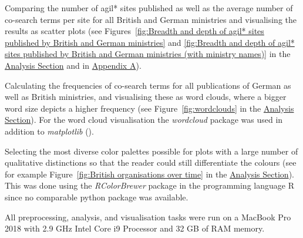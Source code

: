 \begin{compactitem}
\item Comparing the number of agil* sites published as well as the average number of co-search terms per site for all British and German ministries and visualising the results as scatter plots (see Figures~\ref{fig:Breadth and depth of agil* sites published by British and German ministries} and \ref{fig:Breadth and depth of agil* sites published by British and German ministries (with ministry names)} in the \href{Analysis}{Analysis Section} and in \href{Appendix A}{Appendix A}). 
\item Calculating the frequencies of co-search terms for all publications of German as well as British ministries, and visualising these as word clouds, where a bigger word size depicts a higher frequency (see Figure~\ref{fig:wordclouds} in the \href{Analysis}{Analysis Section}). For the word cloud visualisation the \textit{wordcloud} \parencite{Mueller2020} package was used in addition to \textit{matplotlib} (\cite{Hunter2007}).  
\item Selecting the most diverse color palettes possible for plots with a large number of qualitative distinctions so that the reader could still differentiate the colours (see for example Figure~\ref{fig:British organisations over time} in the \href{Analysis}{Analysis Section}). This was done using the \textit{RColorBrewer} package \parencite{Neuwirth2020} in the programming language R since no comparable python package was available. 
\end{compactitem}
\noindent
All preprocessing, analysis, and visualisation tasks were run on a MacBook Pro 2018 with 2.9 GHz Intel Core i9 Processor and 32 GB of RAM memory. 

